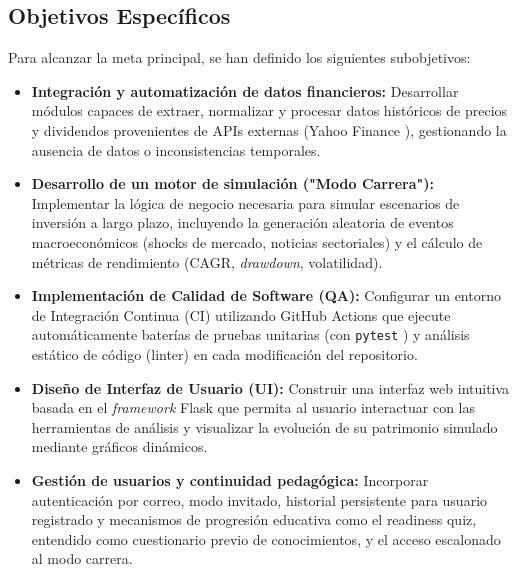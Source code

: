 \subsection{Objetivos Específicos}

Para alcanzar la meta principal, se han definido los siguientes subobjetivos:

\begin{itemize}
    \item \textbf{Integración y automatización de datos financieros:} Desarrollar módulos capaces de extraer, normalizar y procesar datos históricos de precios y dividendos provenientes de APIs externas (Yahoo Finance \cite{yfinance}), gestionando la ausencia de datos o inconsistencias temporales.
    
    \item \textbf{Desarrollo de un motor de simulación ("Modo Carrera"):} Implementar la lógica de negocio necesaria para simular escenarios de inversión a largo plazo, incluyendo la generación aleatoria de eventos macroeconómicos (shocks de mercado, noticias sectoriales) y el cálculo de métricas de rendimiento (CAGR, \textit{drawdown}, volatilidad).
    
    \item \textbf{Implementación de Calidad de Software (QA):} Configurar un entorno de Integración Continua (CI) utilizando GitHub Actions \cite{github_actions} que ejecute automáticamente baterías de pruebas unitarias (con \texttt{pytest} \cite{pytest}) y análisis estático de código (linter) en cada modificación del repositorio.
    
    \item \textbf{Diseño de Interfaz de Usuario (UI):} Construir una interfaz web intuitiva basada en el \textit{framework} Flask \cite{flask} que permita al usuario interactuar con las herramientas de análisis y visualizar la evolución de su patrimonio simulado mediante gráficos dinámicos.
    
    \item \textbf{Gestión de usuarios y continuidad pedagógica:} Incorporar autenticación por correo, modo invitado, historial persistente para usuario registrado y mecanismos de progresión educativa como el readiness quiz, entendido como cuestionario previo de conocimientos, y el acceso escalonado al modo carrera.
\end{itemize}